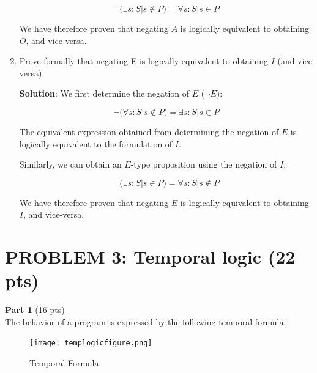 \documentclass[12pt]{article}
\begin{document}
\begin{spacing}{1.5}
\begin{enumerate}
		      $$\neg (\exists s : S | s \notin P) = \forall s : S | s \in P$$
		      		      		      		      		      		      		      
		      We have therefore proven that negating $A$ is logically equivalent to obtaining $O$, and vice-versa.
		      		      		      		      		      		      		              
		\item Prove formally that negating E is logically equivalent to obtaining $I$ (and vice versa).
		      		      		      		      		      		      		      
		      \textbf{Solution}: We first determine the negation of $E$ ($\neg E$):
		      		      		      		      		      		      		      
		      $$\neg (\forall s : S | s \notin P)=\exists s : S | s \in P$$
		      		      		      		      		      		      		      
		      The equivalent expression obtained from determining the negation of $E$ is logically equivalent to the formulation of $I$.
		      		      		      		      		      		      		      
		      Similarly, we can obtain an $E$-type proposition using the negation of $I$:
		      		      		      		      		      		      		      
		      $$\neg (\exists s : S | s \in P) = \forall s : S | s \notin P$$
		      		      		      		      		      		      		      
		      We have therefore proven that negating $E$ is logically equivalent to obtaining $I$, and vice-versa.
		      		      		      		      		      		      		      
	\end{enumerate}
								    
							    
	\newpage
							    
	\section*{PROBLEM 3: Temporal logic (22 pts)}
							
	\textbf{Part 1} (16 pts)\\
							    
	The behavior of a program is expressed by the following temporal formula:
							
	\begin{figure}[htp]
		\centering
		\texttt{[image: templogicfigure.png]}
		\caption{Temporal Formula}
		\label{fig:figure}
	\end{figure}
							

\end{spacing}
\end{document}
